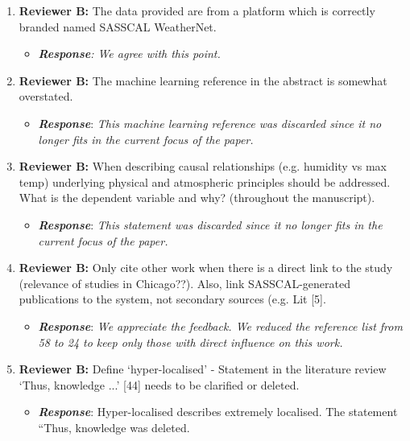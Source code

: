 \documentclass[a4paper, 12pt, conference]{ieeeconf}      %
\begin{document}
\begin{enumerate}
  \item \textbf{Reviewer B:} 	The data provided are from a platform which is correctly branded named SASSCAL WeatherNet.
   \begin{itemize}
   	\item \emph{\textbf{Response}: We agree with this point.}
   \end{itemize}

  \item \textbf{Reviewer B:}  The machine learning reference in the abstract is somewhat overstated. 

  	 	\begin{itemize}
  		\item \textbf{\emph{Response}}: \emph{This  machine learning reference was discarded since it no longer fits in the current focus of the paper.}
  	\end{itemize}
  

  \item \textbf{Reviewer B:}  When describing causal relationships (e.g. humidity vs max temp) underlying physical and atmospheric principles should be addressed. What is the dependent variable and why? (throughout the manuscript). 
 	\begin{itemize}
 	\item \textbf{\emph{Response}}: \emph{This statement was discarded since it no longer fits in the current focus of the paper.}
 \end{itemize}

  \item \textbf{Reviewer B:}  Only cite other work when there is a direct link to the study (relevance of studies in Chicago??). Also, link SASSCAL-generated publications to the system, not secondary sources (e.g. Lit [5].
 	 	\begin{itemize}
 	\item \textbf{\emph{Response}}: \emph{We appreciate the feedback. We reduced the reference list from 58 to 24 to keep only those with direct influence on this work. }
 \end{itemize}
 	

  \item \textbf{Reviewer B:}  Define `hyper-localised' - Statement in the literature review `Thus, knowledge ...' [44] needs to be clarified or deleted.
  	\begin{itemize}
  	\item \textbf{\emph{Response}}: Hyper-localised describes extremely localised. The statement ``Thus, knowledge was deleted.
  \end{itemize}



\end{enumerate}
\end{document}
